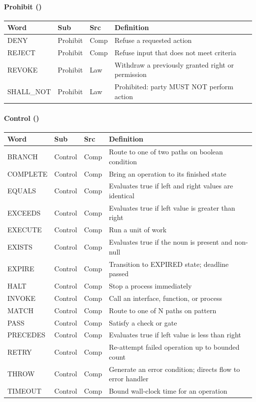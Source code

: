 \documentclass{article}
\begin{document}
\paragraph{Prohibit (\VocabVerbsProhibit)}
\small
\begin{tabular}{lllp{7cm}}
\toprule \textbf{Word} & \textbf{Sub} & \textbf{Src} & \textbf{Definition} \\ \midrule
DENY & Prohibit & Comp & Refuse a requested action \\
REJECT & Prohibit & Comp & Refuse input that does not meet criteria \\
REVOKE & Prohibit & Law & Withdraw a previously granted right or permission \\
SHALL\_NOT & Prohibit & Law & Prohibited: party MUST NOT perform action \\
\bottomrule
\end{tabular}
\normalsize

\paragraph{Control (\VocabVerbsControl)}
\small
\begin{tabular}{lllp{7cm}}
\toprule \textbf{Word} & \textbf{Sub} & \textbf{Src} & \textbf{Definition} \\ \midrule
BRANCH & Control & Comp & Route to one of two paths on boolean condition \\
COMPLETE & Control & Comp & Bring an operation to its finished state \\
EQUALS & Control & Comp & Evaluates true if left and right values are identical \\
EXCEEDS & Control & Comp & Evaluates true if left value is greater than right \\
EXECUTE & Control & Comp & Run a unit of work \\
EXISTS & Control & Comp & Evaluates true if the noun is present and non-null \\
EXPIRE & Control & Comp & Transition to EXPIRED state; deadline passed \\
HALT & Control & Comp & Stop a process immediately \\
INVOKE & Control & Comp & Call an interface, function, or process \\
MATCH & Control & Comp & Route to one of N paths on pattern \\
PASS & Control & Comp & Satisfy a check or gate \\
PRECEDES & Control & Comp & Evaluates true if left value is less than right \\
RETRY & Control & Comp & Re-attempt failed operation up to bounded count \\
THROW & Control & Comp & Generate an error condition; directs flow to error handler \\
TIMEOUT & Control & Comp & Bound wall-clock time for an operation \\
\bottomrule
\end{tabular}
\normalsize
\end{document}
